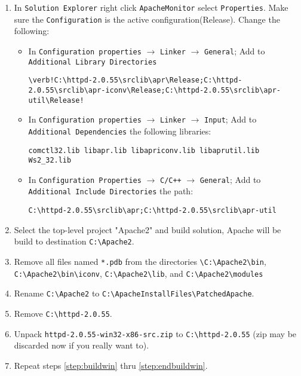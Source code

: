\documentclass[10pt,twoside]{article}
\begin{document}
\begin{enumerate}
\item In \texttt{Solution Explorer} right click \texttt{ApacheMonitor} select
  \texttt{Properties}.  Make sure the \texttt{Configuration} is the active
  configuration(Release).  Change the following:
  \begin{itemize}
  \item In \texttt{Configuration properties} $\rightarrow$ \texttt{Linker}
    $\rightarrow$ \texttt{General};  Add to \texttt{Additional Library
    Directories}
\begin{verbatim}
\verb!C:\httpd-2.0.55\srclib\apr\Release;C:\httpd-2.0.55\srclib\apr-iconv\Release;C:\httpd-2.0.55\srclib\apr-util\Release!
\end{verbatim}
  \item In \texttt{Configuration properties} $\rightarrow$ \texttt{Linker}
    $\rightarrow$ \texttt{Input};  Add to \texttt{Additional Dependencies} the
    following libraries:
\begin{verbatim}
comctl32.lib libapr.lib libapriconv.lib libaprutil.lib Ws2_32.lib
\end{verbatim}
  \item In \texttt{Configuration Properties} $\rightarrow$ \texttt{C/C++}
    $\rightarrow$ \texttt{General};  Add to \texttt{Additional Include
    Directories} the path:
\begin{verbatim}
C:\httpd-2.0.55\srclib\apr;C:\httpd-2.0.55\srclib\apr-util
\end{verbatim}
  \end{itemize}

\item Select the top-level project "Apache2" and build solution, Apache will
  be build to destination \verb!C:\Apache2!.
\item\label{step:endbuildwin} Remove all files named \verb!*.pdb! from the
  directories \verb!\C:\Apache2\bin!, \verb!C:\Apache2\bin\iconv!,
  \verb!C:\Apache2\lib!, and \verb!C:\Apache2\modules!
\item Rename \verb!C:\Apache2! to \verb!C:\ApacheInstallFiles\PatchedApache!.
\item Remove \verb!C:\httpd-2.0.55!.
\item Unpack \verb!httpd-2.0.55-win32-x86-src.zip! to \verb!C:\httpd-2.0.55!
  (zip may be discarded now if you really want to).
\item Repeat steps \ref{step:buildwin} thru \ref{step:endbuildwin}.

\end{enumerate}
\end{document}
